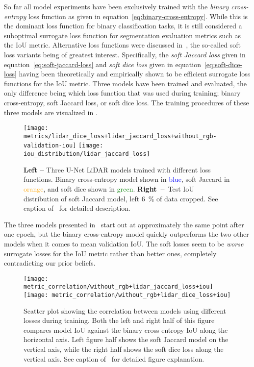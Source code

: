 So far all model experiments have been exclusively trained with the \textit{binary cross-entropy} loss function as given in equation~\eqref{eq:binary-cross-entropy}.
While this is the dominant loss function for binary classification tasks, it is still considered a suboptimal surrogate loss function for segmentation evaluation metrics such as the IoU metric.
Alternative loss functions were discussed in~, the so-called soft loss variants being of greatest interest.
Specifically, the \textit{soft Jaccard loss} given in equation~\eqref{eq:soft-jaccard-loss} and \textit{soft dice loss} given in equation~\eqref{eq:soft-dice-loss} having been theoretically and empirically shown to be efficient surrogate loss functions for the IoU metric.
Three models have been trained and evaluated, the only difference being which loss function that was used during training; binary cross-entropy, soft Jaccard loss, or soft dice loss.
The training procedures of these three models are visualized in .

\begin{figure}[H]
  \centering
  \texttt{[image: metrics/lidar\_dice\_loss+lidar\_jaccard\_loss+without\_rgb-validation-iou]}
  \texttt{[image: iou\_distribution/lidar\_jaccard\_loss]}
  \caption{%
    \textbf{Left --} Three U-Net LiDAR models trained with different loss functions.
    Binary cross-entropy model shown in \textcolor{blue}{blue}, soft Jaccard in \textcolor{orange}{orange}, and soft dice shown in \textcolor{green}{green}.
    \textbf{Right~--}~Test IoU distribution of soft Jaccard model, left \SI{6}{\percent} of data cropped.
    See caption of~ for detailed description.
  }%
  \label{fig:losses-training}
\end{figure}

The three models presented in~ start out at approximately the same point after one epoch, but the binary cross-entropy model quickly outperforms the two other models when it comes to mean validation IoU.
The soft losses seem to be \emph{worse} surrogate losses for the IoU metric rather than better ones, completely contradicting our prior beliefs.

\begin{figure}[H]
  \centering
  \texttt{[image: metric\_correlation/without\_rgb+lidar\_jaccard\_loss+iou]}
  \textcolor{gray}{\vrule}
  \texttt{[image: metric\_correlation/without\_rgb+lidar\_dice\_loss+iou]}
  \caption{%
    Scatter plot showing the correlation between models using different losses during training.
    Both the left and right half of this figure compares model IoU against the binary cross-entropy IoU along the horizontal axis.
    Left figure half shows the soft Jaccard model on the vertical axis, while the right half shows the soft dice loss along the vertical axis.
    See caption of~ for detailed figure explanation.
  }
\end{figure}

